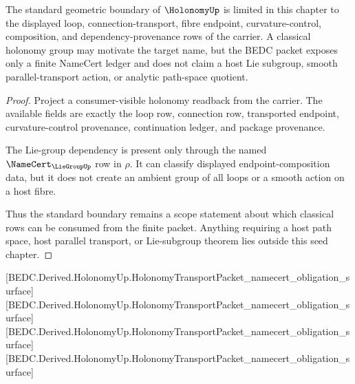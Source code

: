 \begin{theorem}
\label{thm:holonomy-standard-boundary-scope}
The standard geometric boundary of $\HolonomyUp$ is limited in this chapter to the displayed loop, connection-transport, fibre endpoint, curvature-control, composition, and dependency-provenance rows of the carrier. A classical holonomy group may motivate the target name, but the BEDC packet exposes only a finite NameCert ledger and does not claim a host Lie subgroup, smooth parallel-transport action, or analytic path-space quotient.
\end{theorem}
\begin{proof}
Project a consumer-visible holonomy readback from the carrier. The available fields are exactly the loop row, connection row, transported endpoint, curvature-control provenance, continuation ledger, and package provenance.

The Lie-group dependency is present only through the named $\NameCert_{\LieGroupUp}$ row in $\rho$. It can classify displayed endpoint-composition data, but it does not create an ambient group of all loops or a smooth action on a host fibre.

Thus the standard boundary remains a scope statement about which classical rows can be consumed from the finite packet. Anything requiring a host path space, host parallel transport, or Lie-subgroup theorem lies outside this seed chapter.
\end{proof}

[BEDC.Derived.HolonomyUp.HolonomyTransportPacket\_namecert\_obligation\_surface]
[BEDC.Derived.HolonomyUp.HolonomyTransportPacket\_namecert\_obligation\_surface]
[BEDC.Derived.HolonomyUp.HolonomyTransportPacket\_namecert\_obligation\_surface]
[BEDC.Derived.HolonomyUp.HolonomyTransportPacket\_namecert\_obligation\_surface]
\begin{closurestatus}{\HolonomyUp}
  \theoryclosure{\matureClosure}
  \formalstatus{\axiomCleanV}
\end{closurestatus}
